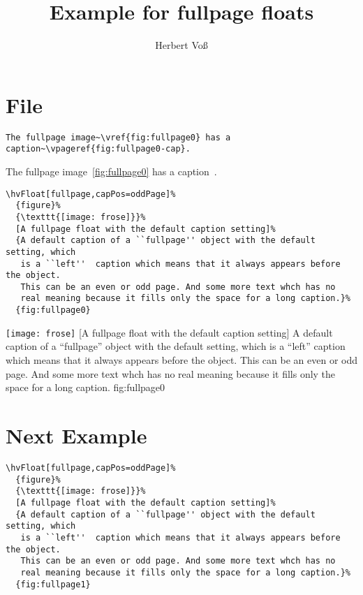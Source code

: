 \documentclass[twoside]{scrartcl}
\begin{document}
\title{Example for fullpage floats}
\author{Herbert Voß}
\maketitle

\tableofcontents

\blinddocument

\section{File \texttt{\jobname}}

\begin{lstlisting}
The fullpage image~\vref{fig:fullpage0} has a caption~\vpageref{fig:fullpage0-cap}.
\end{lstlisting}

The fullpage image~\vref{fig:fullpage0} has a caption~.

\begin{lstlisting}
\hvFloat[fullpage,capPos=oddPage]%
  {figure}%
  {\texttt{[image: frose]}}%
  [A fullpage float with the default caption setting]%
  {A default caption of a ``fullpage'' object with the default setting, which
   is a ``left''  caption which means that it always appears before the object.
   This can be an even or odd page. And some more text whch has no
   real meaning because it fills only the space for a long caption.}%
  {fig:fullpage0}
\end{lstlisting}

\Float[capPos=oddPage]
%
  {\texttt{[image: frose]}}%
  [A fullpage float with the default caption setting]%
  {A default caption of a ``fullpage'' object with the default setting, which
   is a ``left''  caption which means that it always appears before the object.
   This can be an even or odd page. And some more text whch has no
   real meaning because it fills only the space for a long caption.}%
  {fig:fullpage0}

\blinddocument

\section{Next Example}

\begin{lstlisting}
\hvFloat[fullpage,capPos=oddPage]%
  {figure}%
  {\texttt{[image: frose]}}%
  [A fullpage float with the default caption setting]%
  {A default caption of a ``fullpage'' object with the default setting, which
   is a ``left''  caption which means that it always appears before the object.
   This can be an even or odd page. And some more text whch has no
   real meaning because it fills only the space for a long caption.}%
  {fig:fullpage1}
\end{lstlisting}
\end{document}
